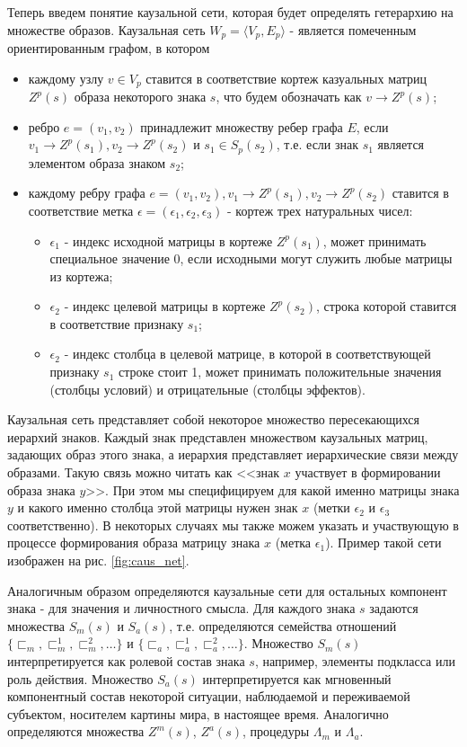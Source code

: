 \documentclass[12pt]{scrartcl}
\begin{document}
	Теперь введем понятие каузальной сети, которая будет определять гетерархию на множестве образов. Каузальная сеть $W_p=\langle V_p, E_p \rangle$ - является помеченным ориентированным графом, в котором
	\begin{itemize}
		\item каждому узлу $v\in V_p$ ставится в соответствие кортеж казуальных матриц $Z^p(s)$ образа некоторого знака $s$, что будем обозначать как $v\rightarrow Z^p(s)$;
		\item ребро $e=(v_1, v_2)$ принадлежит множеству ребер графа $E$, если $v_1\rightarrow Z^p(s_1), v_2\rightarrow Z^p(s_2)$ и $s_1\in S_p(s_2)$, т.е. если знак $s_1$ является элементом образа знаком $s_2$;
		\item каждому ребру графа $e=(v_1, v_2), v_1\rightarrow Z^p(s_1), v_2\rightarrow Z^p(s_2)$ ставится в соответствие метка $\epsilon=(\epsilon_1,\epsilon_2,\epsilon_3)$ - кортеж трех натуральных чисел:
		\begin{itemize}
			\item $\epsilon_1$ - индекс исходной матрицы в кортеже $Z^p(s_1)$, может принимать специальное значение 0, если исходными могут служить любые матрицы из кортежа;
			\item $\epsilon_2$ - индекс целевой матрицы в кортеже $Z^p(s_2)$, строка которой ставится в соответствие признаку $s_1$;
			\item $\epsilon_2$ - индекс столбца в целевой матрице, в которой в соответствующей признаку $s_1$ строке стоит 1, может принимать положительные значения (столбцы условий) и отрицательные (столбцы эффектов).
		\end{itemize}		
	\end{itemize}
	
	Каузальная сеть представляет собой некоторое множество пересекающихся иерархий знаков. Каждый знак представлен множеством каузальных матриц, задающих образ этого знака, а иерархия представляет иерархические связи между образами. Такую связь можно читать как <<знак $x$ участвует в формировании образа знака $y$>>. При этом мы специфицируем для какой именно матрицы знака $y$ и какого именно столбца этой матрицы нужен знак $x$ (метки $\epsilon_2$ и $\epsilon_3$ соответственно). В некоторых случаях мы также можем указать и участвующую в процессе формирования образа матрицу знака $x$ (метка $\epsilon_1$). Пример такой сети изображен на рис. \ref{fig:caus_net}.
	
	Аналогичным образом определяются каузальные сети для остальных компонент знака - для значения и личностного смысла. Для каждого знака $s$ задаются множества $S_m(s)$ и $S_a(s)$, т.е. определяются семейства отношений $\{\sqsubset_m,\sqsubset_m^1,\sqsubset_m^2,\dots\}$ и $\{\sqsubset_a,\sqsubset_a^1,\sqsubset_a^2,\dots\}$. Множество $S_m(s)$ интерпретируется как ролевой состав знака $s$, например, элементы подкласса или роль действия. Множество $S_a(s)$ интерпретируется как мгновенный компонентный состав некоторой ситуации, наблюдаемой и переживаемой субъектом, носителем картины мира, в настоящее время. Аналогично определяются множества $Z^m(s)$, $Z^a(s)$, процедуры $\Lambda_m$ и $\Lambda_a$.
	
\end{document}
